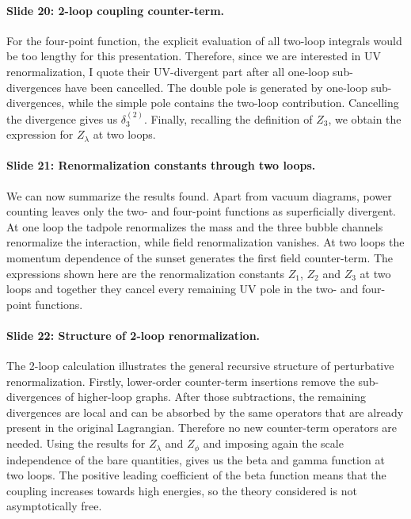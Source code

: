 \documentclass[11pt,a4paper]{article}
\begin{document}
\paragraph{Slide 20: 2-loop coupling counter-term.}

For the four-point function, the explicit evaluation of all two-loop integrals would be too lengthy for this presentation. Therefore, since we are interested in UV renormalization, I quote their UV-divergent part after all one-loop sub-divergences have been cancelled. 
The double pole is generated by one-loop sub-divergences, while the simple pole contains the two-loop contribution. Cancelling the divergence gives us $\delta_3^{(2)}$. Finally, recalling the definition of $Z_3$, we obtain the expression for $Z_\lambda$ at two loops.

\paragraph{Slide 21: Renormalization constants through two loops.}

We can now summarize the results found. Apart from vacuum diagrams, power counting leaves only the two- and four-point functions as superficially divergent. At one loop the tadpole renormalizes the mass and the three bubble channels renormalize the interaction, while field renormalization vanishes. At two loops the momentum dependence of the sunset generates the first field counter-term. The expressions shown here are the renormalization constants $Z_1$, $Z_2$ and $Z_3$ at two loops and together they cancel every remaining UV pole in the two- and four-point functions.

\paragraph{Slide 22: Structure of 2-loop renormalization.}

The 2-loop calculation illustrates the general recursive structure of perturbative renormalization. Firstly, lower-order counter-term insertions remove the sub-divergences of higher-loop graphs. After those subtractions, the remaining divergences are local and can be absorbed by the same operators that are already present in the original Lagrangian. Therefore no new counter-term operators are needed. Using the results for $Z_\lambda$ and $Z_\phi$ and imposing again the scale independence of the bare quantities, gives us the beta and gamma function at two loops. The positive leading coefficient of the beta function means that the coupling increases towards high energies, so the theory considered is not asymptotically free.
\end{document}
